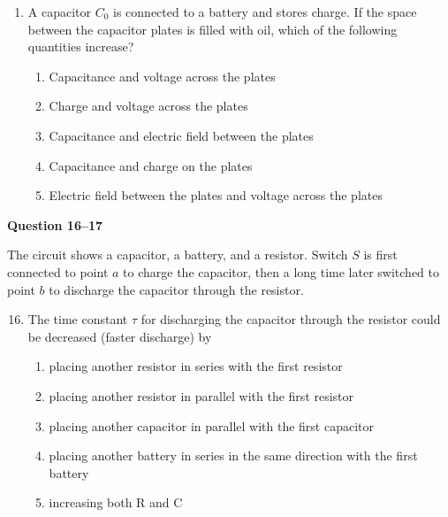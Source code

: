 \documentclass[11pt]{article}
\begin{document}
\begin{multicols}{2}
\begin{enumerate}[leftmargin=18pt]
    \columnbreak

  \item A capacitor $C_0$ is connected to a battery and stores charge. If the
    space between the capacitor plates is filled with oil, which of the
    following quantities increase?
    \begin{enumerate}[noitemsep,topsep=0pt,leftmargin=18pt,label=(\Alph*)]
    \item Capacitance and voltage across the plates
    \item Charge and voltage across the plates
    \item Capacitance and electric field between the plates
    \item Capacitance and charge on the plates
    \item Electric field between the plates and voltage across the plates
    \end{enumerate}
  \end{enumerate}

  \textbf{Question 16--17}
  
  The circuit shows a capacitor, a battery, and a resistor. Switch $S$ is first
  connected to point $a$ to charge the capacitor, then a long time later
  switched to point $b$ to discharge the capacitor through the resistor.
  \begin{center}
  \end{center}
  
  \begin{enumerate}[leftmargin=18pt]
    \setcounter{enumi}{15}
  \item The time constant $\tau$ for discharging the capacitor through the
    resistor could be decreased (faster discharge) by
    \begin{enumerate}[noitemsep,topsep=0pt,leftmargin=18pt,label=(\Alph*)]
    \item placing another resistor in series with the first resistor
    \item placing another resistor in parallel with the first resistor
    \item placing another capacitor in parallel with the first capacitor
    \item placing another battery in series in the same direction with the
      first battery
    \item increasing both R and C
    \end{enumerate}


\end{enumerate}
\end{multicols}
\end{document}

